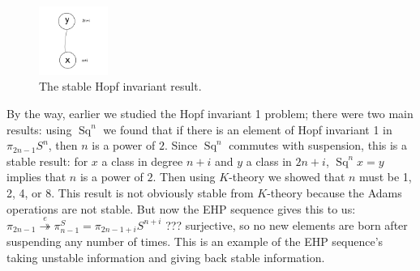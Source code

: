 \documentclass{article}
\newcommand{\onto}{\twoheadrightarrow}
\DeclareMathOperator{\Sq}{Sq}
\begin{document}
\begin{figure}
\centering\includegraphics[width=0.2\textwidth]{figures/18.pdf}
\caption{\small The stable Hopf invariant result.}
\end{figure}
By the way, earlier we studied the Hopf invariant 1 problem; there were two main results: using $\Sq^n$ we found that if there is an element of Hopf invariant 1 in $\pi_{2n-1} S^n$, then $n$ is a power of $2$.  Since $\Sq^n$ commutes with suspension, this is a stable result: for $x$ a class in degree $n+i$ and $y$ a class in $2n+i$, $\Sq^n x = y$ implies that $n$ is a power of $2$.  Then using $K$-theory we showed that $n$ must be 1, 2, 4, or 8.  This result is not obviously stable from $K$-theory because the Adams operations are not stable.  But now the EHP sequence gives this to us: $\pi_{2n-1} \stackrel{e}{\onto} \pi_{n-1}^S = \pi_{2n-1+i} S^{n+i}$ ??? surjective, so no new elements are born after suspending any number of times.  This is an example of the EHP sequence's taking unstable information and giving back stable information.
\end{document}
